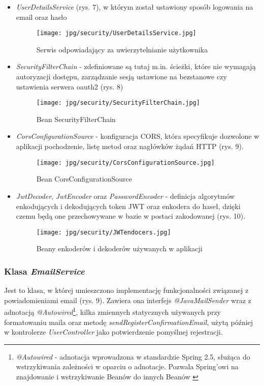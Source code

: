 \documentclass[11pt,a4paper]{article}
\begin{document}
\begin{itemize}
    \item \textsl{UserDetailsService} (rys. 7), w którym został ustawiony sposób logowania na email oraz hasło
    \begin{figure}[H]
        \centering
        \texttt{[image: jpg/security/UserDetailsService.jpg]}
        \caption{Serwis odpowiadający za uwierzytelnianie użytkownika}
    \end{figure}

    \item \textsl{SecurityFilterChain} - zdefiniowane są tutaj m.in. ścieżki, które nie wymagają autoryzacji dostępu, zarządzanie sesją ustawione na bezstanowe czy ustawienia serwera oauth2 (rys. 8)
    \begin{figure}[H]
        \centering
        \texttt{[image: jpg/security/SecurityFilterChain.jpg]}
        \caption{Bean SecurityFilterChain}
    \end{figure}

    \newpage
    \item \textsl{CorsConfigurationSource} - konfiguracja CORS, która specyfikuje dozwolone w aplikacji pochodzenie, listę metod oraz nagłówków żądań HTTP (rys. 9).
    \begin{figure}[H]
        \centering
        \texttt{[image: jpg/security/CorsConfigurationSource.jpg]}
        \caption{Bean CorsConfigurationSource}
    \end{figure}

    \item \textsl{JwtDecoder}, \textsl{JwtEncoder} oraz \textsl{PasswordEncoder} - definicja algorytmów enkodujących i dekodujących token JWT oraz enkodera do haseł, dzięki czemu będą one przechowywane w bazie w postaci zakodowanej (rys. 10).
    \begin{figure}[H]
        \centering
        \texttt{[image: jpg/security/JWTendocers.jpg]}
        \caption{Beany enkoderów i dekoderów używanych w aplikacji}
    \end{figure}
\end{itemize}

\subsubsection{Klasa \textsl{EmailService}}

Jest to klasa, w której umieszczono implementację funkcjonalności związanej z powiadomieniami email (rys. 9). Zawiera ona interfejs \textcolor{keywordColour}{\textsl{@JavaMailSender}} wraz z adnotacją \textcolor{keywordColour}{\textsl{@Autowired}\footnote{\textsl{@Autowired} - adnotacja wprowadzona w standardzie Spring 2.5, służąca do wstrzykiwania zależności w oparciu o adnotacje. Pozwala Spring'owi na znajdowanie i wstrzykiwanie Beanów do innych Beanów \cite{autowire}}}, kilka zmiennych statycznych używanych przy formatowaniu maila oraz metodę \textsl{sendRegisterConfirmationEmail}, użytą później w kontrolerze \textsl{UserController} jako potwierdzenie pomyślnej rejestracji.
\end{document}
